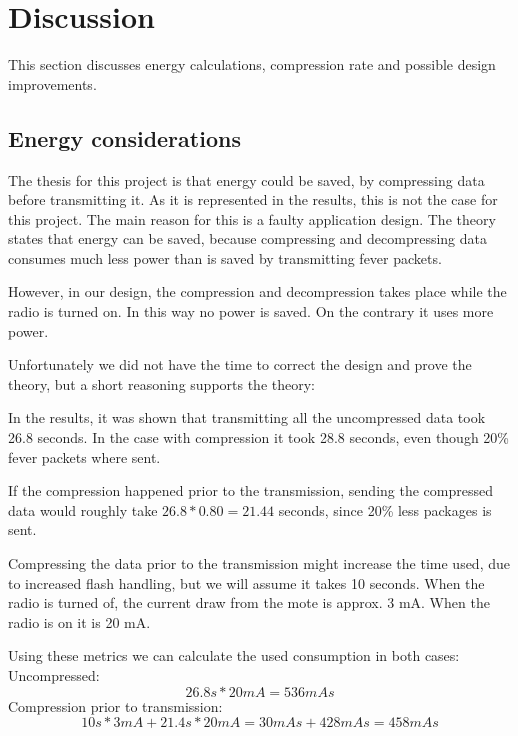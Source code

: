 \chapter{Discussion}

This section discusses energy calculations, compression rate and possible design improvements.  

\section{Energy considerations}

The thesis for this project is that energy could be saved, by compressing data before transmitting it. As it is represented in the results, this is not the case for this project. The main reason for this is a faulty application design. 
The theory states that energy can be saved, because compressing and decompressing data consumes much less power than is saved by transmitting fever packets.

However, in our design, the compression and decompression takes place while the radio is turned on. In this way no power is saved. On the contrary it uses more power.

Unfortunately we did not have the time to correct the design and prove the theory, but a short reasoning supports the theory:

In the results, it was shown that transmitting all the uncompressed data took 26.8 seconds. 
In the case with compression it took 28.8 seconds, even though 20\% fever packets where sent. 

If the compression happened prior to the transmission, sending the compressed data would roughly take $26.8*0.80 = 21.44$ seconds, since 20\% less packages is sent. 

Compressing the data prior to the transmission might increase the time used, due to increased flash handling, but we will assume it takes 10 seconds.
When the radio is turned of, the current draw from the mote is approx. 3 mA. When the radio is on it is 20 mA. 

Using these metrics we can calculate the used consumption in both cases:\\
Uncompressed:
\begin{equation}
26.8 s * 20 mA = 536 mAs
\end{equation}
Compression prior to transmission:
\begin{equation}
10 s * 3 mA + 21.4 s * 20 mA = 30 mAs + 428 mAs  = 458 mAs
\end{equation}

